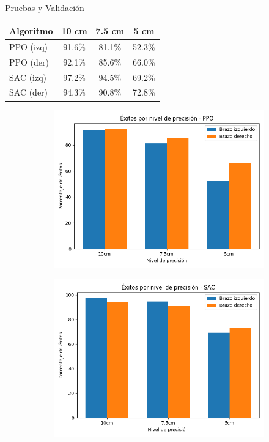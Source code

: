 \documentclass[spanish,10pt]{beamer}
\begin{document}
	\begin{frame}{Pruebas y Validación}
		\begin{table}[ht]
			\centering
			\begin{tabular}{lccc}
				\toprule
				\textbf{Algoritmo} & \textbf{10 cm} & \textbf{7.5 cm} & \textbf{5 cm} \\
				\midrule
				PPO (izq) & 91.6\% & 81.1\% & 52.3\% \\
				PPO (der) & 92.1\% & 85.6\% & 66.0\% \\
				SAC (izq) & 97.2\% & 94.5\% & 69.2\% \\
				SAC (der) & 94.3\% & 90.8\% & 72.8\% \\
				\bottomrule
			\end{tabular}
		\end{table}

		\begin{figure}[h!]
			\centering
			
			\begin{subfigure}[b]{0.46\textwidth}
				\centering
				\includegraphics[width=\textwidth]{images/resultados/success_comparison_ppo}
			\end{subfigure}
			\hfill
			\begin{subfigure}[b]{0.46\textwidth}
				\centering
				\includegraphics[width=\textwidth]{images/resultados/success_comparison_sac}
			\end{subfigure}
			

\end{figure}
\end{frame}
\end{document}
